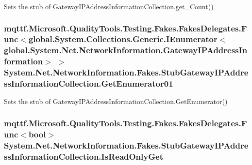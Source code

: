 Sets the stub of Gateway\-I\-P\-Address\-Information\-Collection.\-get\-\_\-\-Count()

\hypertarget{class_system_1_1_net_1_1_network_information_1_1_fakes_1_1_stub_gateway_i_p_address_information_collection_afbceca8f699e61d4261c5d20f6537303}{
\subsubsection[{Get\-Enumerator01}]{\setlength{\rightskip}{0pt plus 5cm}mqttf.\-Microsoft.\-Quality\-Tools.\-Testing.\-Fakes.\-Fakes\-Delegates.\-Func$<$global.\-System.\-Collections.\-Generic.\-I\-Enumerator$<$global.\-System.\-Net.\-Network\-Information.\-Gateway\-I\-P\-Address\-Information$>$ $>$ System.\-Net.\-Network\-Information.\-Fakes.\-Stub\-Gateway\-I\-P\-Address\-Information\-Collection.\-Get\-Enumerator01}}\label{class_system_1_1_net_1_1_network_information_1_1_fakes_1_1_stub_gateway_i_p_address_information_collection_afbceca8f699e61d4261c5d20f6537303}


Sets the stub of Gateway\-I\-P\-Address\-Information\-Collection.\-Get\-Enumerator()

\hypertarget{class_system_1_1_net_1_1_network_information_1_1_fakes_1_1_stub_gateway_i_p_address_information_collection_add585b581df88297895caa9124678f2d}{
\subsubsection[{Is\-Read\-Only\-Get}]{\setlength{\rightskip}{0pt plus 5cm}mqttf.\-Microsoft.\-Quality\-Tools.\-Testing.\-Fakes.\-Fakes\-Delegates.\-Func$<$bool$>$ System.\-Net.\-Network\-Information.\-Fakes.\-Stub\-Gateway\-I\-P\-Address\-Information\-Collection.\-Is\-Read\-Only\-Get}}\label{class_system_1_1_net_1_1_network_information_1_1_fakes_1_1_stub_gateway_i_p_address_information_collection_add585b581df88297895caa9124678f2d}


